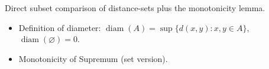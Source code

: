 \begin{remark*}
Direct subset comparison of distance-sets plus the monotonicity lemma.
\end{remark*}

\begin{remark*}[Dependencies]
\begin{itemize}
  \item Definition of diameter: $\operatorname{diam}(A) = \sup\{d(x,y) : x,y \in A\}$,
        $\operatorname{diam}(\varnothing) = 0$.
  \item Monotonicity of Supremum (set version).
\end{itemize}
\end{remark*}
